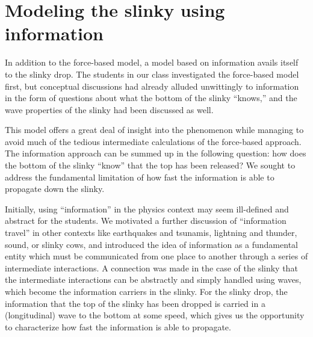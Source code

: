 \documentclass[prb,preprint,superscriptaddress]{revtex4-1}
\begin{document}
\section{Modeling the slinky using information}
\label{sec:information}

In addition to the force-based model, a model based on information avails itself to
the slinky drop.
The students in our class investigated the force-based model first, but
conceptual discussions had already alluded
unwittingly to information in the form of questions about
what the bottom of the slinky ``knows,'' and the wave properties
of the slinky had been discussed as well.

This model offers a great deal of insight into the phenomenon while
managing to avoid much of the tedious intermediate calculations of the force-based
approach. The information approach can be summed up in the following question:
how does the bottom of the slinky ``know'' that the top has been released? We sought
to address the fundamental limitation of how fast the information is able to propagate
down the slinky.

Initially, using ``information'' in the physics context may seem ill-defined and
abstract for the students.
We motivated a further discussion of ``information travel'' in other contexts
like earthquakes and tsunamis, 
lightning and thunder, sound, or slinky cows,
and introduced the idea of information as a fundamental entity which must be
communicated from one place to another through a series of intermediate interactions.
A connection was made in the case of the slinky that the intermediate interactions
can be abstractly and simply handled using waves, which become the information
carriers in the slinky.
For the slinky drop,
the information that the top of the slinky has been dropped is carried in a (longitudinal) wave to the bottom
at some speed, which gives us the opportunity to characterize how fast the
information is able to propagate.
\end{document}
